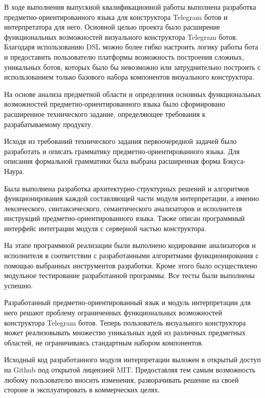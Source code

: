 \newpage


В ходе выполнения выпускной квалификационной работы выполнена разработка предметно-ориентированного языка для конструктора Telegram ботов и интерпретатора для него.
Основной целью проекта было расширение функциональных возможностей визуального конструктора Telegram ботов.
Благодаря использованию DSL можно более гибко настроить логику работы бота и предоставить пользователю платформы возможность построения сложных, уникальных ботов,
которых было бы невозможно или затруднительно построить с использованием только базового набора компонентов визуального конструктора.

На основе анализа предметной области и определения основных функциональных возможностей предметно-ориентированного языка было сформировано расширенное технического задание,
определяющее требования к разрабатываемому продукту.

Исходя из требований технического задания первоочередной задачей было разработать и описать грамматику предметно-ориентированного языка.
Для описания формальной грамматики была выбрана расширенная форма Бэкуса-Наура.

Была выполнена разработка архитектурно-структурных решений и алгоритмов функционирования каждой составляющей части модуля интерпретации,
а именно лексического, синтаксического, семантического анализаторов и исполнителя инструкций предметно-ориентированного языка.
Также описан программный интерфейс интеграции модуля с серверной частью конструктора.

На этапе программной реализации были выполнено кодирование анализаторов и исполнителя
в соответствии с разработанными алгоритмами функционирования с помощью выбранных инструментов разработки.
Кроме этого было осуществлено модульное тестирование разработанной программы.
Все тесты были выполнены успешно.

Разработанный предметно-ориентированный язык и модуль интерпретации для него решают проблему ограниченных функциональных возможностей конструктора Telegram ботов.
Теперь пользователь визуального конструктора может реализовывать множество уникальных идей из различных предметных областей,
не ограничиваясь стандартным набором компонентов.

Исходный код разработанного модуля интерпретации выложен в открытый доступ на Github под открытой лицензией MIT.
Предоставляя тем самым возможность любому пользователю вносить изменения, разворачивать решение на своей стороне и эксплуатировать в коммерческих целях.
